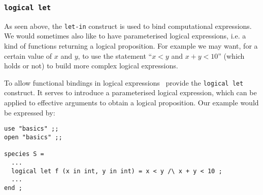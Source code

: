 \subsubsection{{\tt logical let}}
As seen above, the {\tt let-in} construct is used to bind
computational expressions. We would sometimes also like to have parameterised logical
expressions, i.e. a kind of functions returning a logical proposition.
For example we may want,  for a certain value of $x$ and $y$, to use the statement
``$x<y$ and $x+y < 10$'' (which holds or not) to build more complex
logical expressions.






To allow functional bindings in logical expressions \focal\ provide
the {\tt logical let} construct. It serves to introduce a
parameterised logical expression,  which can be applied to effective
arguments to obtain a logical proposition.  Our example would be
expressed by:
{\scriptsize
\begin{lstlisting}
use "basics" ;;
open "basics" ;;

species S =
  ...
  logical let f (x in int, y in int) = x < y /\ x + y < 10 ;
  ...
end ;
\end{lstlisting}
}

